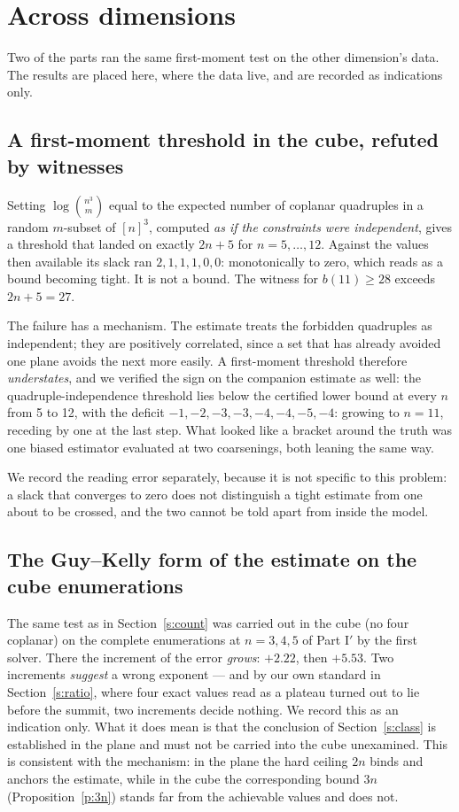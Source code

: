 \documentclass[11pt,a4paper]{article}
\begin{document}
\section{Across dimensions}\label{s:across}
Two of the parts ran the same first-moment test on the other dimension's data.  The results are placed here, where the
data live, and are recorded as indications only.

\subsection{A first-moment threshold in the cube, refuted by witnesses}\label{s:refuted}
Setting $\log\binom{n^3}{m}$ equal to the expected number of coplanar quadruples in a random
$m$-subset of $[n]^3$, computed \emph{as if the constraints were independent}, gives a threshold that
landed on exactly $2n+5$ for $n=5,\dots,12$.  Against the values then available its slack ran
$2,1,1,1,0,0$: monotonically to zero, which reads as a bound becoming tight.  It is not a bound.
The witness for $b(11)\ge28$ exceeds $2n+5=27$.

The failure has a mechanism.  The estimate treats the forbidden quadruples as independent; they
are positively correlated, since a set that has already avoided one plane avoids the next more
easily.  A first-moment threshold therefore \emph{understates}, and we verified the sign on the
companion estimate as well: the quadruple-independence threshold lies below the certified lower
bound at every $n$ from 5 to 12, with the deficit $-1,-2,-3,-3,-4,-4,-5,-4$: growing to $n=11$, receding by one at the last step.  What
looked like a bracket around the truth was one biased estimator evaluated at two coarsenings,
both leaning the same way.

We record the reading error separately, because it is not specific to this problem: a slack that
converges to zero does not distinguish a tight estimate from one about to be crossed, and the two
cannot be told apart from inside the model.

\subsection{The Guy--Kelly form of the estimate on the cube enumerations}\label{s:cubetest}
The same test as in Section~\ref{s:count} was carried out in the cube (no four coplanar) on the complete enumerations at
$n=3,4,5$ of Part I$'$ by the first solver.  There the increment of the error \emph{grows}: $+2.22$, then $+5.53$.
Two increments \emph{suggest} a wrong exponent --- and by our own standard in
Section~\ref{s:ratio}, where four exact values read as a plateau turned out to lie before the summit, two
increments decide nothing.  We record this as an indication only.  What it does mean is that the
conclusion of Section~\ref{s:class} is established in the plane and must not be carried into the cube
unexamined.  This is consistent with the
mechanism: in the plane the hard ceiling $2n$ binds and anchors the estimate, while in the cube the
corresponding bound $3n$ (Proposition~\ref{p:3n}) stands far from the achievable values and does not.
\end{document}
